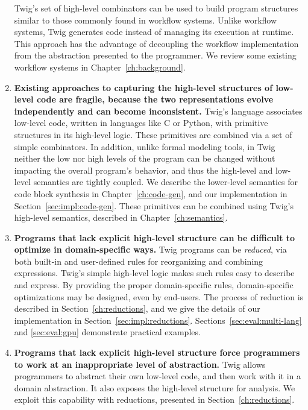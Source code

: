 \begin{enumerate}
Twig's set of high-level combinators can be used to build program
structures similar to those commonly found in workflow systems.
Unlike workflow systems, Twig generates code instead of managing
its execution at runtime. This approach has the advantage of
decoupling the workflow implementation from the abstraction
presented to the programmer. We review some existing workflow
systems in Chapter~\ref{ch:background}.


\item\textbf{Existing approaches to capturing the high-level
structures of low-level code are fragile, because the two
representations evolve independently and can become inconsistent.}
Twig's language associates low-level code, written in languages
like C or Python, with primitive structures in its high-level
logic. These primitives are combined via a set of simple
combinators. In addition, unlike formal modeling tools, in Twig
neither the low nor high levels of the program can be changed
without impacting the overall program's behavior, and thus the
high-level and low-level semantics are tightly coupled. We
describe the lower-level semantics for code block synthesis in
Chapter~\ref{ch:code-gen}, and our implementation in
Section~\ref{sec:impl:code-gen}. These primitives can be combined
using Twig's high-level semantics, described in
Chapter~\ref{ch:semantics}.

\item\textbf{Programs that lack explicit high-level structure can
be difficult to optimize in domain-specific ways.} Twig programs
can be \emph{reduced}, via both built-in and user-defined rules
for reorganizing and combining expressions. Twig's simple
high-level logic makes such rules easy to describe and express. By
providing the proper domain-specific rules, domain-specific
optimizations may be designed, even by end-users. The process of
reduction is described in Section~\ref{ch:reductions}, and we give
the details of our implementation in
Section~\ref{sec:impl:reductions}.
Sections~\ref{sec:eval:multi-lang} and \ref{sec:eval:gpu}
demonstrate practical examples.

\item\textbf{Programs that lack explicit high-level structure
force programmers to work at an inappropriate level of
abstraction.} Twig allows programmers to abstract their own
low-level code, and then work with it in a domain abstraction. It
also exposes the high-level structure for analysis. We exploit
this capability with reductions, presented in
Section~\ref{ch:reductions}.

\end{enumerate}

